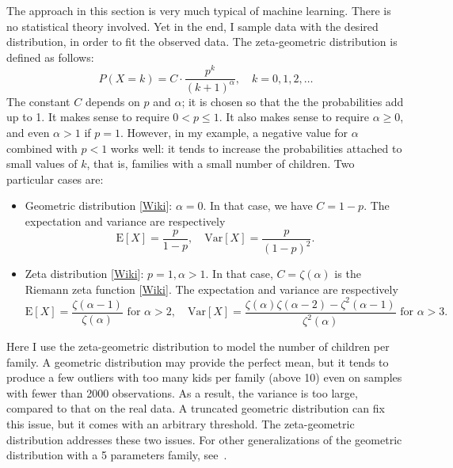 \documentclass[oneside,10pt]{book}
\begin{document}
The approach in this section is very much typical of machine learning. There is no statistical theory involved. Yet in the end, 
 I sample data with the desired distribution, in order to fit the observed data. The 
\textcolor{index}{zeta-geometric distribution} is defined as follows:
\begin{equation}
P(X = k) = C\cdot \frac{p^k}{(k+1)^\alpha},\quad k=0,1,2,\dots \label{treces}
\end{equation}
The constant $C$ depends on $p$ and $\alpha$; it is chosen so that the the probabilities add up to 1. It makes sense 
 to require $0< p\leq 1$. It also makes sense to require $\alpha\geq 0$, and even $\alpha > 1$ if $p=1$. However, in my example,
  a negative value for $\alpha$ combined with $p<1$ works well: it tends to increase the probabilities attached to small values of $k$, that is, families with a small
 number of children.  Two particular cases are:\vspace{1ex}
\begin{itemize}
\item \textcolor{index}{Geometric distribution} [\href{https://en.wikipedia.org/wiki/Geometric_distribution}{Wiki}]: $\alpha = 0$. In that case, we have $C = 1-p$. The expectation and variance are respectively
 $$\text{E}[X]=\frac{p}{1-p}, \quad \text{Var}[X]=\frac{p}{(1-p)^2}.$$
\item \textcolor{index}{Zeta distribution} [\href{https://en.wikipedia.org/wiki/Zeta_distribution}{Wiki}]: $p=1,\alpha>1$. In that case, $C=\zeta(\alpha)$ is the 
\textcolor{index}{Riemann zeta function} [\href{https://en.wikipedia.org/wiki/Riemann_zeta_function}{Wiki}]. The expectation and variance are respectively
 $$
\text{E}[X] =\frac{\zeta(\alpha-1)}{\zeta(\alpha)} \text{ for } \alpha>2, \quad
 \text{Var}[X] =\frac{\zeta(\alpha)\zeta(\alpha-2) - \zeta^2(\alpha-1)}{\zeta^2(\alpha)}  \text{ for } \alpha>3.
$$
\end{itemize}
Here I use the zeta-geometric distribution to model the number of children per family. A geometric distribution may provide the perfect mean, but it tends to produce
 a few outliers with too many kids per family (above 10) even on samples with fewer than 2000 observations. As a result, the variance is too large, compared to that on the real data. A truncated geometric distribution can fix this issue, but it comes with an
 arbitrary threshold. The zeta-geometric distribution addresses these two issues. For other generalizations of the geometric distribution  with a 5 parameters family, see~\cite{gammageo17}.
\end{document}
